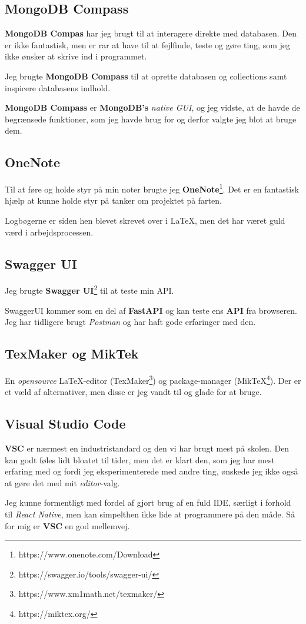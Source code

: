 \documentclass{report}
\begin{document}
\subsection{MongoDB Compass}
\textbf{MongoDB Compas} har jeg brugt til at interagere direkte med databasen. Den er ikke fantastisk, men er rar at have til at fejlfinde, teste og gøre ting, som jeg ikke ønsker at skrive ind i programmet.\par{}
Jeg brugte \textbf{MongoDB Compass} til at oprette databasen og collections samt inspicere databasens indhold.\par{}
\textbf{MongoDB Compass} er \textbf{MongoDB’s} \textit{native GUI}, og jeg vidste, at de havde de begrænsede funktioner, som jeg havde brug for og derfor valgte jeg blot at bruge dem.\par{}

\subsection{OneNote}
Til at føre og holde styr på min noter brugte jeg \textbf{OneNote}\footnote{https://www.onenote.com/Download}. Det er en fantastisk hjælp at kunne holde styr på tanker om projektet på farten.\par{}
Logbøgerne er siden hen blevet skrevet over i \LaTeX , men det har været guld værd i arbejdsprocessen.

\subsection{Swagger UI}
Jeg brugte \textbf{Swagger UI}\footnote{https://swagger.io/tools/swagger-ui/} til at teste min API.\par{}
SwaggerUI kommer som en del af \textbf{FastAPI}  og kan teste ens \textbf{API} fra browseren. Jeg har tidligere brugt \textit{Postman} og har haft gode erfaringer med den.

\subsection{TexMaker og MikTek}
En \textit{opensource} \LaTeX-editor (TexMaker\footnote{https://www.xm1math.net/texmaker/}) og package-manager (MikTeX\footnote{https://miktex.org/}). Der er et væld af alternativer, men disse er jeg vandt til og glade for at bruge.

\subsection{Visual Studio Code}
\textbf{VSC} er nærmest en industristandard og den vi har brugt mest på skolen. Den kan godt føles lidt bloatet  til tider, men det er klart den, som jeg har mest erfaring med og fordi jeg eksperimenterede med andre ting, ønskede jeg ikke også at gøre det med mit \textit{editor}-valg.\par{}
Jeg kunne formentligt med fordel af gjort brug af en fuld IDE, særligt i forhold til \textit{React Native}, men kan simpelthen ikke lide at programmere på den måde. Så for mig er \textbf{VSC} en god mellemvej.\par{}
\end{document}
